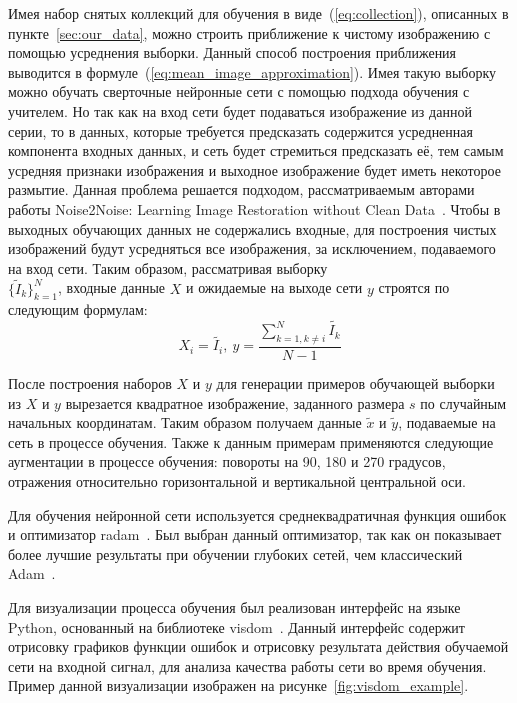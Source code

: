 \documentclass[14pt]{mmcs_article}
\begin{document}
Имея набор снятых коллекций для обучения в виде~(\ref{eq:collection}), описанных в пункте~\ref{sec:our_data}, можно строить приближение к чистому изображению с помощью усреднения выборки. Данный способ построения приближения выводится в формуле~(\ref{eq:mean_image_approximation}). Имея такую выборку можно обучать сверточные нейронные сети с помощью подхода обучения с учителем. Но так как на вход сети будет подаваться изображение из данной серии, то в данных, которые требуется предсказать содержится усредненная компонента входных данных, и сеть будет стремиться предсказать её, тем самым усредняя признаки изображения и выходное изображение будет иметь некоторое размытие. Данная проблема решается подходом, рассматриваемым авторами работы Noise2Noise: Learning Image Restoration without Clean Data~\autocite{Noise2NoisePaper}. Чтобы в выходных обучающих данных не содержались входные, для построения чистых изображений будут усредняться все изображения, за исключением, подаваемого на вход сети. Таким образом, рассматривая выборку \\$\{\tilde{I}_k\}_{k=1}^{N}$, входные данные $X$ и ожидаемые на выходе сети $y$ строятся по следующим формулам:
\begin{equation}\label{eq:dataset}
X_i = \tilde{I_i},\ y = \frac{\sum_{k=1, k \ne i}^{N}\tilde{I_k}}{N - 1}
\end{equation}

После построения наборов $X$ и $y$ для генерации примеров обучающей выборки из $X$ и $y$ вырезается квадратное изображение, заданного размера $s$ по случайным начальных координатам. Таким образом получаем данные $\tilde{x}$ и $\tilde{y}$, подаваемые на сеть в процессе обучения. Также к данным примерам применяются следующие аугментации в процессе обучения: повороты на 90, 180 и 270 градусов, отражения относительно горизонтальной и вертикальной центральной оси.

Для обучения нейронной сети используется среднеквадратичная функция ошибок и оптимизатор radam~\autocite{RadamPaper}. Был выбран данный оптимизатор, так как он показывает более лучшие результаты при обучении глубоких сетей, чем классический Adam~\autocite{AdamPaper}.

Для визуализации процесса обучения был реализован интерфейс на языке Python, основанный на библиотеке visdom~\autocite{VisdomRepo}. Данный интерфейс содержит отрисовку графиков функции ошибок и отрисовку результата действия обучаемой сети на входной сигнал, для анализа качества работы сети во время обучения. Пример данной визуализации изображен на рисунке~\ref{fig:visdom_example}.
\end{document}
